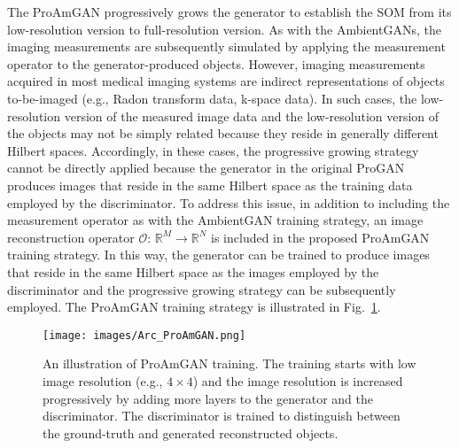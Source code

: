 \documentclass[journal]{IEEEtran}
\begin{document}
The ProAmGAN progressively grows the generator to establish the SOM from its low-resolution version to full-resolution version.
As with the AmbientGANs, the imaging measurements are subsequently simulated by applying the measurement operator to the generator-produced objects.
However, imaging measurements acquired in most medical imaging systems are indirect representations of objects to-be-imaged (e.g., Radon transform data, k-space data).
In such cases, 
the low-resolution version of the measured image data
and the low-resolution version of the objects may not be simply related
because they reside in generally different Hilbert spaces.
Accordingly, in these cases, the progressive growing strategy cannot be directly applied 
because the generator in the original ProGAN 
produces images that reside in the same Hilbert space as the training data employed by the discriminator. 
To address this issue, in addition to including the measurement operator as with the AmbientGAN training strategy, an image reconstruction operator
 $\mathcal{O}$: $\mathbb{R}^{M} \rightarrow \mathbb{R}^N$ 
 is included in the proposed ProAmGAN training strategy. 
 In this way, 
 the generator can be trained to produce images that reside in the same Hilbert space as the images employed by the discriminator
 and the progressive growing strategy can be subsequently employed.
The ProAmGAN training strategy is illustrated in Fig.~\ref{fig:arc_PAGAN}.
 
\begin{figure}[H]
\centering
 \texttt{[image: images/Arc\_ProAmGAN.png]}
  \caption{An illustration of ProAmGAN training. The training starts with low image resolution (e.g., $4\times 4$) and the image resolution is increased progressively by adding more layers to the generator and the discriminator. The discriminator is trained to distinguish between the ground-truth and generated reconstructed objects.}
  \label{fig:arc_PAGAN}
  \end{figure}
 
\end{document}
